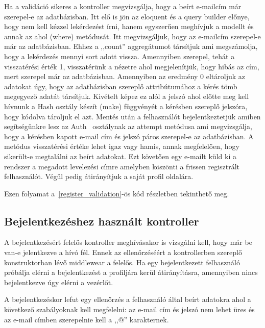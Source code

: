 \documentclass[
]{thesis-ekf}
\theoremstyle{definition}
\theoremstyle{remark}
\begin{document}
	Ha a validáció sikeres a kontroller megvizsgálja, hogy a beírt e-mailcím már szerepel-e az adatbázisban. Itt elő is jön az eloquent és a query builder előnye, hogy nem kell kézzel lekérdezést írni, hanem egyszerűen meghívjuk a modellt és annak az ahol (where) metódusát. Itt megvizsgáljuk, hogy az e-mailcím szerepel-e már az adatbázisban. Ehhez a ,,count'' aggregátumot társítjuk ami megszámolja, hogy a lekérdezés mennyi sort adott vissza. Amennyiben szerepel, tehát a visszatérési érték 1, visszatérünk a nézetre ahol megjelenítjük, hogy hibás az cím, mert szerepel már az adatbázisban. Amennyiben az eredmény 0 eltároljuk az adatokat úgy, hogy az adatbázisban szereplő attribútumához a kérés tömb megegyező adatát társítjuk. Kivételt képez ez alól a jelszó ahol előtte meg kell hívnunk a Hash osztály készít (make) függvényét a kérésben szereplő jelszóra, hogy kódolva tároljuk el azt. Mentés után a felhasználót bejelentkeztetjük amiben segítségünkre lesz az Auth~\cite{laravel_auth} osztálynak az attempt metódusa ami megvizsgálja, hogy a kérésben kapott e-mail cím és jelszó páros szerepel-e az adatbázisban. A metódus visszatérési értéke lehet igaz vagy hamis, annak megfelelően, hogy sikerült-e megtalálni az beírt adatokat. Ezt követően egy e-mailt küld ki a rendszer a megadott levelezési címre amelyben köszönti a frissen regisztrált felhasználót. Végül pedig átirányítjuk a saját profil oldalára.
	
	Ezen folyamat a~\ref{register_validation}-ös kód részletben tekinthető meg.
	
	
	
	\subsection{Bejelentkezéshez használt kontroller}
	A bejelentkezésért felelős kontroller meghívásakor is vizsgálni kell, hogy már be van-e jelentkezve a hívó fél. Ennek az ellenőrzéséért a kontrollerben szereplő konstruktorban lévő middlewear a felelős. Ha egy bejelentkezett felhasználó próbálja elérni a bejelentkezést a profiljára kerül átirányításra, amennyiben nincs bejelentkezve úgy elérni a vezérlőt.
	
	A bejelentkezéskor lefut egy ellenőrzés a felhasználó által beírt adatokra ahol a következő szabályoknak kell megfelelni: az e-mail cím és jelszó nem lehet üres és az e-mail címben szerepelnie kell a ,,@'' karakternek.
	
\end{document}
